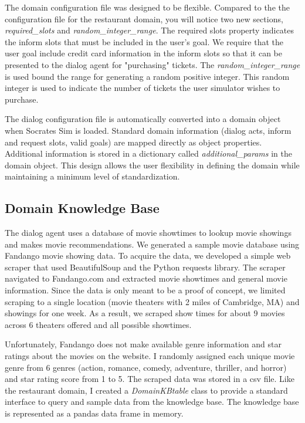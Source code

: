 The domain configuration file was designed to be flexible. Compared to the the configuration file for the restaurant domain, you will notice two new sections, \textit{required\_slots} and \textit{random\_integer\_range}. The required slots property indicates the inform slots that must be included in the user's goal. We require that the user goal include credit card information in the inform slots so that it can be presented to the dialog agent for "purchasing" tickets. The \textit{random\_integer\_range} is used bound the range for generating a random positive integer. This random integer is used to indicate the number of tickets the user simulator wishes to purchase. 

The dialog configuration file is automatically converted into a domain object when Socrates Sim is loaded. Standard domain information (dialog acts, inform and request slots, valid goals) are mapped directly as object properties. Additional information is stored in a dictionary called \textit{additional\_params} in the domain object. This design allows the user flexibility in defining the domain while maintaining a minimum level of standardization. 

\subsection{Domain Knowledge Base}

The dialog agent uses a database of movie showtimes to lookup movie showings and makes movie recommendations. We generated a sample movie database using Fandango movie showing data. To acquire the data, we developed a simple web scraper that used BeautifulSoup and the Python requests library. The scraper navigated to Fandango.com and extracted movie showtimes and general movie information. Since the data is only meant to be a proof of concept, we limited scraping to a single location (movie theaters with 2 miles of Cambridge, MA) and showings for one week. As a result, we scraped show times for about 9 movies across 6 theaters offered and all possible showtimes. 

Unfortunately, Fandango does not make available genre information and star ratings about the movies on the website. I randomly assigned each unique movie genre from 6 genres (action, romance, comedy, adventure, thriller, and horror) and star rating score from 1 to 5. The scraped data was stored in a csv file. Like the restaurant domain, I created a \textit{DomainKBtable} class to provide a standard interface to query and sample data from the knowledge base. The knowledge base is represented as a pandas data frame in memory. 

